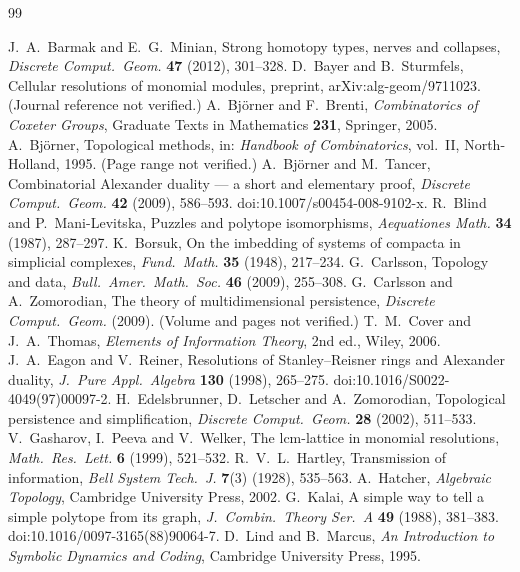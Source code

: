 \begin{thebibliography}{99}
\small
{} J.~A.~Barmak and E.~G.~Minian, Strong homotopy types, nerves and collapses, \emph{Discrete Comput.\ Geom.} \textbf{47} (2012), 301--328.
 D.~Bayer and B.~Sturmfels, Cellular resolutions of monomial modules, preprint, arXiv:alg-geom/9711023. (Journal reference not verified.)
 A.~Bj\"orner and F.~Brenti, \emph{Combinatorics of Coxeter Groups}, Graduate Texts in Mathematics \textbf{231}, Springer, 2005.
 A.~Bj\"orner, Topological methods, in: \emph{Handbook of Combinatorics}, vol.~II, North-Holland, 1995. (Page range not verified.)
 A.~Bj\"orner and M.~Tancer, Combinatorial Alexander duality --- a short and elementary proof, \emph{Discrete Comput.\ Geom.} \textbf{42} (2009), 586--593. doi:10.1007/s00454-008-9102-x.
 R.~Blind and P.~Mani-Levitska, Puzzles and polytope isomorphisms, \emph{Aequationes Math.} \textbf{34} (1987), 287--297.
 K.~Borsuk, On the imbedding of systems of compacta in simplicial complexes, \emph{Fund.\ Math.} \textbf{35} (1948), 217--234.
 G.~Carlsson, Topology and data, \emph{Bull.\ Amer.\ Math.\ Soc.} \textbf{46} (2009), 255--308.
 G.~Carlsson and A.~Zomorodian, The theory of multidimensional persistence, \emph{Discrete Comput.\ Geom.} (2009). (Volume and pages not verified.)
 T.~M.~Cover and J.~A.~Thomas, \emph{Elements of Information Theory}, 2nd ed., Wiley, 2006.
 J.~A.~Eagon and V.~Reiner, Resolutions of Stanley--Reisner rings and Alexander duality, \emph{J.\ Pure Appl.\ Algebra} \textbf{130} (1998), 265--275. doi:10.1016/S0022-4049(97)00097-2.
 H.~Edelsbrunner, D.~Letscher and A.~Zomorodian, Topological persistence and simplification, \emph{Discrete Comput.\ Geom.} \textbf{28} (2002), 511--533.
 V.~Gasharov, I.~Peeva and V.~Welker, The lcm-lattice in monomial resolutions, \emph{Math.\ Res.\ Lett.} \textbf{6} (1999), 521--532.
 R.~V.~L.~Hartley, Transmission of information, \emph{Bell System Tech.\ J.} \textbf{7}(3) (1928), 535--563.
 A.~Hatcher, \emph{Algebraic Topology}, Cambridge University Press, 2002.
 G.~Kalai, A simple way to tell a simple polytope from its graph, \emph{J.\ Combin.\ Theory Ser.\ A} \textbf{49} (1988), 381--383. doi:10.1016/0097-3165(88)90064-7.
 D.~Lind and B.~Marcus, \emph{An Introduction to Symbolic Dynamics and Coding}, Cambridge University Press, 1995.

\end{thebibliography}
